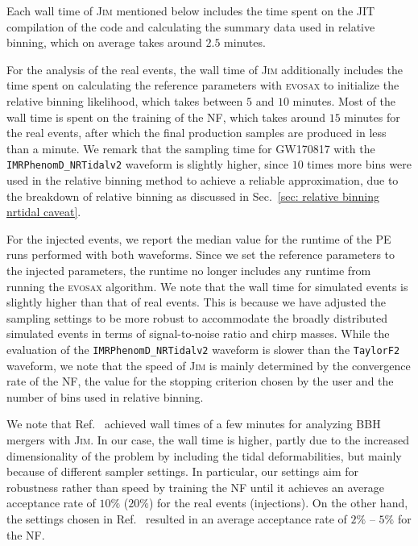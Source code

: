 \documentclass[prd,twocolumn,a4paper,floatfix,nofootinbib,preprintnumbers,superscriptaddress]{revtex4-1}
\begin{document}
Each wall time of \textsc{Jim} mentioned below includes the time spent on the JIT compilation of the code and calculating the summary data used in relative binning, which on average takes around $2.5$ minutes.

For the analysis of the real events, the wall time of \textsc{Jim} additionally includes the time spent on calculating the reference parameters with \textsc{evosax} to initialize the relative binning likelihood, which takes between $5$ and $10$ minutes. Most of the wall time is spent on the training of the \ac{NF}, which takes around $15$ minutes for the real events, after which the final production samples are produced in less than a minute. We remark that the sampling time for GW170817 with the \texttt{IMRPhenomD\_NRTidalv2} waveform is slightly higher, since $10$ times more bins were used in the relative binning method to achieve a reliable approximation, due to the breakdown of relative binning as discussed in Sec.~\ref{sec: relative binning nrtidal caveat}.

For the injected events, we report the median value for the runtime of the \ac{PE} runs performed with both waveforms. Since we set the reference parameters to the injected parameters, the runtime no longer includes any runtime from running the \textsc{evosax} algorithm. We note that the wall time for simulated events is slightly higher than that of real events. This is because we have adjusted the sampling settings to be more robust to accommodate the broadly distributed simulated events in terms of signal-to-noise ratio and chirp masses. While the evaluation of the \texttt{IMRPhenomD\_NRTidalv2} waveform is slower than the \texttt{TaylorF2} waveform, we note that the speed of \textsc{Jim} is mainly determined by the convergence rate of the \ac{NF}, the value for the stopping criterion chosen by the user and the number of bins used in relative binning.  

We note that Ref.~\cite{Wong:2023lgb} achieved wall times of a few minutes for analyzing \ac{BBH} mergers with \textsc{Jim}. In our case, the wall time is higher, partly due to the increased dimensionality of the problem by including the tidal deformabilities, but mainly because of different sampler settings. In particular, our settings aim for robustness rather than speed by training the \ac{NF} until it achieves an average acceptance rate of $10\%$ ($20\%$) for the real events (injections). On the other hand, the settings chosen in Ref.~\cite{Wong:2023lgb} resulted in an average acceptance rate of $2\%$ -- $5\%$ for the \ac{NF}.
\end{document}
